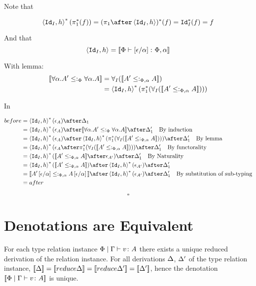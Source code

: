 {        Note that 

        \begin{equation}
            \pr{\Id{I}}{h}\star(\pstar(f)) = (\p\after\pr{\Id{I}}{h})\star(f) = \Id{I}\star(f) = f
        \end{equation}

        And that 
        \begin{equation}
            \left\langle\texttt{Id}_{I}, h\right\rangle = {\bf [\![}\Phi \vdash \left[\epsilon / \alpha\right] \colon \Phi,\alpha{\bf ]\!]}
        \end{equation}

        With lemma:
        \begin{align}
            {\bf [\![}\forall \alpha. A'\leq:_\Phi{\forall \alpha. A}{\bf ]\!]} & = \forall_I({\bf [\![}A' \leq:_{\Phi, \alpha} A{\bf ]\!]})\\
            & = \left\langle\texttt{Id}_{I}, h\right\rangle^*(\pi_1^*(\forall_I({\bf [\![}A' \leq:_{\Phi, \alpha} A{\bf ]\!]})))
        \end{align}

        In

        \begin{align}
            before &= \pr{\Id{I}}{h}\star(\e_A)\after\D_1\\
            &= \pr{\Id{I}}{h}\star(\e_A)\after\deno{\all{\a}{A'}\subtypep{\all{\a}{A}}}\after\D_1'\qt{By induction}\\
            &= \pr{\Id{I}}{h}\star(\e_A)\after\pr{\Id{I}}{h}\star(\pstar(\allI(\deno{A' \subtypepa A})))\after\D_1'\qt{By lemma}\\
            &= \pr{\Id{I}}{h}\star(\e_A\after \pstar(\allI(\deno{A' \subtypepa A})))\after\D_1'\qt{By functorality}\\
            & = \pr{\Id{I}}{h}\star(\deno{A' \subtypepa A}\after\e_{A'})\after\D_1'\qt{By Naturality}\\
            & =  \pr{\Id{I}}{h}\star(\deno{A' \subtypepa A})\after\pr{\Id{I}}{h}\star(\e_{A'})\after\D_1'\\
            & =  \deno{A'\ssub{\a}{\e} \subtypepa A\ssub{\a}{\e}}\after\pr{\Id{I}}{h}\star(\e_{A'})\after\D_1'\qt{By substitution of sub-typing}\\
            & = after
        \end{align}
        
    $$\square$$   

    \section{Denotations are Equivalent}
    For each type relation instance $\Phi\mid\Gamma \vdash v \colon A$ there exists a unique reduced derivation of the relation instance. For all derivations $\Delta$, $\Delta'$ of the type relation instance, $\deno{\D} = \deno{\reduce{\D}} = \deno{\reduce{\D'}} = \deno{\D'} $, hence the denotation ${\bf [\![}\Phi\mid\Gamma \vdash v \colon A{\bf ]\!]}$ is unique.
}

